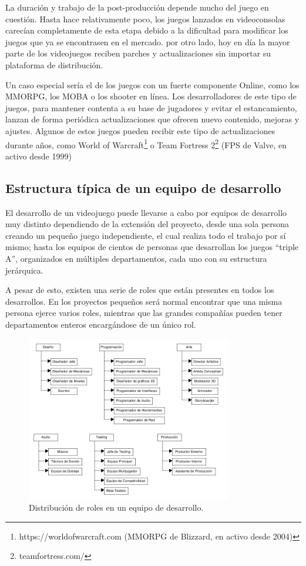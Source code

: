 La duración y trabajo de la post-producción depende mucho del juego en cuestión. Hasta hace relativamente poco, los juegos lanzados en videoconsolas carecían completamente de esta etapa debido a la dificultad para modificar los juegos que ya se encontrasen en el mercado. por otro lado, hoy en día la mayor parte de los videojuegos reciben parches y actualizaciones sin importar su plataforma de distribución\cite{development_and_production}.

Un caso especial sería el de los juegos con un fuerte componente Online, como los MMORPG, los MOBA o los shooter en línea. Los desarrolladores de este tipo de juegos, para mantener contenta a su base de jugadores y evitar el estancamiento, lanzan de forma periódica actualizaciones que ofrecen nuevo contenido, mejoras y ajustes. Algunos de estos juegos pueden recibir este tipo de actualizaciones durante años, como World of Warcraft\footnote{https://worldofwarcraft.com (MMORPG de Blizzard, en activo desde 2004)} o Team Fortress 2\footnote{teamfortress.com/} (FPS de Valve, en activo desde 1999)

\subsection{Estructura típica de un equipo de desarrollo}
El desarrollo de un videojuego puede llevarse a cabo por equipos de desarrollo muy distinto dependiendo de la extensión del proyecto, desde una sola persona creando un pequeño juego independiente, el cual realiza todo el trabajo por sí mismo; hasta los equipos de cientos de personas que desarrollan los juegos ``triple A'', organizados en múltiples departamentos, cada uno con su estructura jerárquica.

A pesar de esto, existen una serie de roles que están presentes en todos los desarrollos. En los proyectos pequeños será normal encontrar que una misma persona ejerce varios roles, mientras que las grandes compañías pueden tener departamentos enteros encargándose de un único rol.

\begin{figure}[h]
    \centering
    \includegraphics[width=0.8\textwidth]{images/estadodelarte/desarrollo/table-roles}
    \caption{Distribución de roles en un equipo de desarrollo.}
\end{figure}


